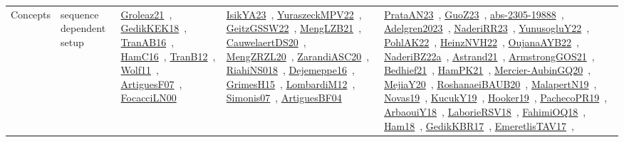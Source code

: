 {\begin{longtable}{lp{3cm}>{\raggedright\arraybackslash}p{6cm}>{\raggedright\arraybackslash}p{6cm}>{\raggedright\arraybackslash}p{8cm}}
\index{sequence dependent setup}\index{Concepts!sequence dependent setup}Concepts & sequence dependent setup & \href{../works/Groleaz21.pdf}{Groleaz21}~\cite{Groleaz21}, \href{../works/GedikKEK18.pdf}{GedikKEK18}~\cite{GedikKEK18}, \href{../works/TranAB16.pdf}{TranAB16}~\cite{TranAB16}, \href{../works/HamC16.pdf}{HamC16}~\cite{HamC16}, \href{../works/TranB12.pdf}{TranB12}~\cite{TranB12}, \href{../works/Wolf11.pdf}{Wolf11}~\cite{Wolf11}, \href{../works/ArtiguesF07.pdf}{ArtiguesF07}~\cite{ArtiguesF07}, \href{../works/FocacciLN00.pdf}{FocacciLN00}~\cite{FocacciLN00} & \href{../works/IsikYA23.pdf}{IsikYA23}~\cite{IsikYA23}, \href{../works/YuraszeckMPV22.pdf}{YuraszeckMPV22}~\cite{YuraszeckMPV22}, \href{../works/GeitzGSSW22.pdf}{GeitzGSSW22}~\cite{GeitzGSSW22}, \href{../works/MengLZB21.pdf}{MengLZB21}~\cite{MengLZB21}, \href{../works/CauwelaertDS20.pdf}{CauwelaertDS20}~\cite{CauwelaertDS20}, \href{../works/MengZRZL20.pdf}{MengZRZL20}~\cite{MengZRZL20}, \href{../works/ZarandiASC20.pdf}{ZarandiASC20}~\cite{ZarandiASC20}, \href{../works/RiahiNS018.pdf}{RiahiNS018}~\cite{RiahiNS018}, \href{../works/Dejemeppe16.pdf}{Dejemeppe16}~\cite{Dejemeppe16}, \href{../works/GrimesH15.pdf}{GrimesH15}~\cite{GrimesH15}, \href{../works/LombardiM12.pdf}{LombardiM12}~\cite{LombardiM12}, \href{../works/Simonis07.pdf}{Simonis07}~\cite{Simonis07}, \href{../works/ArtiguesBF04.pdf}{ArtiguesBF04}~\cite{ArtiguesBF04} & \href{../works/PrataAN23.pdf}{PrataAN23}~\cite{PrataAN23}, \href{../works/GuoZ23.pdf}{GuoZ23}~\cite{GuoZ23}, \href{../works/abs-2305-19888.pdf}{abs-2305-19888}~\cite{abs-2305-19888}, \href{../works/Adelgren2023.pdf}{Adelgren2023}~\cite{Adelgren2023}, \href{../works/NaderiRR23.pdf}{NaderiRR23}~\cite{NaderiRR23}, \href{../works/YunusogluY22.pdf}{YunusogluY22}~\cite{YunusogluY22}, \href{../works/PohlAK22.pdf}{PohlAK22}~\cite{PohlAK22}, \href{../works/HeinzNVH22.pdf}{HeinzNVH22}~\cite{HeinzNVH22}, \href{../works/OujanaAYB22.pdf}{OujanaAYB22}~\cite{OujanaAYB22}, \href{../works/NaderiBZ22a.pdf}{NaderiBZ22a}~\cite{NaderiBZ22a}, \href{../works/Astrand21.pdf}{Astrand21}~\cite{Astrand21}, \href{../works/ArmstrongGOS21.pdf}{ArmstrongGOS21}~\cite{ArmstrongGOS21}, \href{../works/Bedhief21.pdf}{Bedhief21}~\cite{Bedhief21}, \href{../works/HamPK21.pdf}{HamPK21}~\cite{HamPK21}, \href{../works/Mercier-AubinGQ20.pdf}{Mercier-AubinGQ20}~\cite{Mercier-AubinGQ20}, \href{../works/MejiaY20.pdf}{MejiaY20}~\cite{MejiaY20}, \href{../works/RoshanaeiBAUB20.pdf}{RoshanaeiBAUB20}~\cite{RoshanaeiBAUB20}, \href{../works/MalapertN19.pdf}{MalapertN19}~\cite{MalapertN19}, \href{../works/Novas19.pdf}{Novas19}~\cite{Novas19}, \href{../works/KucukY19.pdf}{KucukY19}~\cite{KucukY19}, \href{../works/Hooker19.pdf}{Hooker19}~\cite{Hooker19}, \href{../works/PachecoPR19.pdf}{PachecoPR19}~\cite{PachecoPR19}, \href{../works/ArbaouiY18.pdf}{ArbaouiY18}~\cite{ArbaouiY18}, \href{../works/LaborieRSV18.pdf}{LaborieRSV18}~\cite{LaborieRSV18}, \href{../works/FahimiOQ18.pdf}{FahimiOQ18}~\cite{FahimiOQ18}, \href{../works/Ham18.pdf}{Ham18}~\cite{Ham18}, \href{../works/GedikKBR17.pdf}{GedikKBR17}~\cite{GedikKBR17}, \href{../works/EmeretlisTAV17.pdf}{EmeretlisTAV17}~\cite{EmeretlisTAV17}, 
\end{longtable}}
